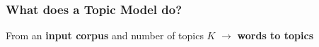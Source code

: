 \documentclass[compress]{beamer}
\begin{document}
\begin{frame}

\begin{center}
\frametitle{What does a Topic Model do?}
From an \textbf<1>{input corpus} and number of topics \textbf<1>{$K$} $\rightarrow$ \textbf<2>{words to topics} \\
\end{center}

\end{frame}
\end{document}
